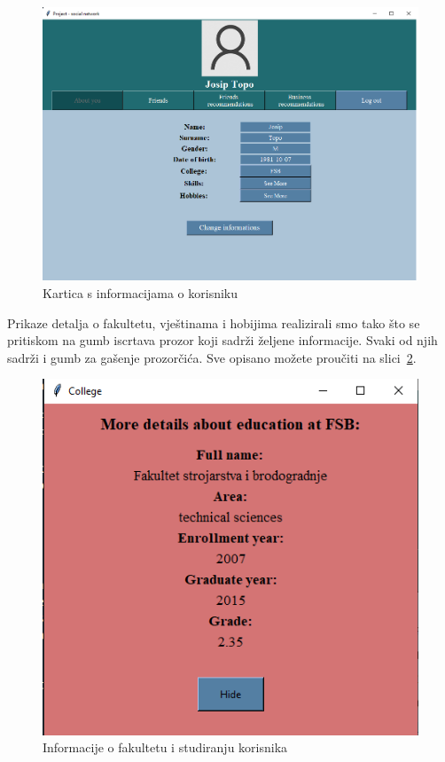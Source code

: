 \documentclass[titlepage, 12pt]{scrartcl}
\begin{document}
	\begin{figure}
		\begin{center}
			\includegraphics[scale=0.45]{slike/info.png}
			\caption{Kartica s informacijama o korisniku}
			\label{fig:info} 
		\end{center}
	\end{figure}
	Prikaze detalja o fakultetu, vještinama i hobijima realizirali smo tako što se pritiskom na gumb iscrtava prozor koji sadrži željene informacije. Svaki od njih sadrži i gumb za gašenje prozorčića. Sve opisano možete proučiti na slici~\ref{fig:coll_info}.
	
	\begin{figure}
		\begin{center}
			\includegraphics[scale=0.9]{slike/coll_info.png}
			\caption{Informacije o fakultetu i studiranju korisnika}
			\label{fig:coll_info} 
		\end{center}
	\end{figure}
	
\end{document}
